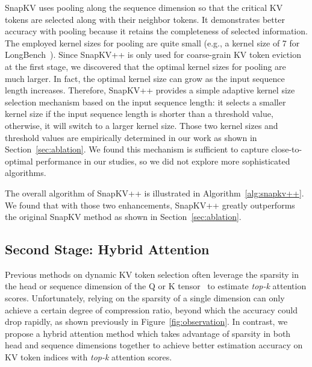SnapKV uses pooling along the sequence dimension so that the critical KV tokens are selected along with their neighbor tokens. It demonstrates better accuracy with pooling because it retains the completeness of selected information.
The employed kernel sizes for pooling are quite small (e.g., a kernel size of 7 for LongBench~\cite{longbench2023}). Since SnapKV++ is only used for coarse-grain KV token eviction at the first stage, we discovered that the optimal kernel sizes for pooling are much larger. In fact, the optimal kernel size can grow as the input sequence length increases. Therefore, SnapKV++ provides a simple adaptive kernel size selection mechanism based on the input sequence length: it selects a smaller kernel size if the input sequence length is shorter than a threshold value, otherwise, it will switch to a larger kernel size. Those two kernel sizes and threshold values are empirically determined in our work as shown in Section~\ref{sec:ablation}. We found this mechanism is sufficient to capture close-to-optimal performance in our studies, so we did not explore more sophisticated algorithms. 

The overall algorithm of SnapKV++ is illustrated in Algorithm~\ref{alg:snapkv++}. We found that with those two enhancements, SnapKV++ greatly outperforms the original SnapKV method as shown in Section~\ref{sec:ablation}.














\subsection{Second Stage: Hybrid Attention}
Previous methods on dynamic KV token selection often leverage the sparsity in the head or sequence dimension of the Q or K tensor~\cite{quest2024, sparq2024, loki2024}  to estimate \textit{top-k} attention scores. Unfortunately, relying on the sparsity of a single dimension can only achieve a certain degree of compression ratio, beyond which the accuracy could drop rapidly, as shown previously in Figure~\ref{fig:observation}. In contrast, we propose a hybrid attention method which takes advantage of sparsity in both head and sequence dimensions together to achieve better estimation accuracy on KV token indices with \textit{top-k} attention scores. 

